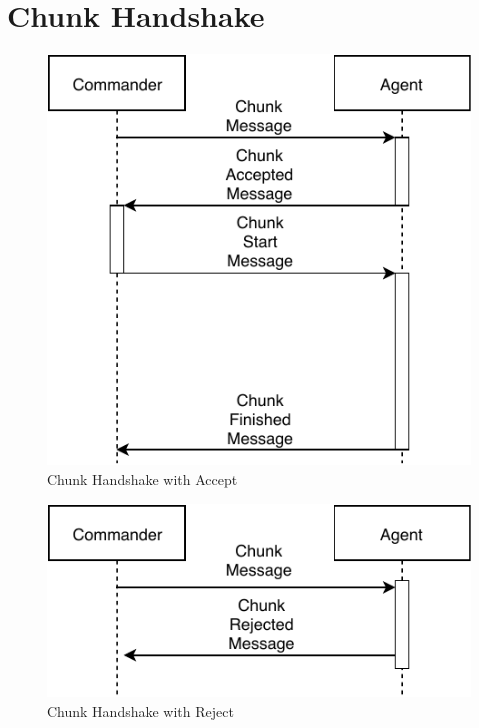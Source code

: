 \section{Chunk Handshake}
\begin{figure}[h]
	\begin{center}
	\includegraphics[scale=1]{Resources/PDF/ChunkAcceptedHandshake}
	\caption{Chunk Handshake with Accept}
	\label{pic:ChunkAcceptedHandshake}
	\end{center}
\end{figure}

\begin{figure}[h]
	\begin{center}
	\includegraphics[scale=1]{Resources/PDF/ChunkRejectHandshake}
	\caption{Chunk Handshake with Reject}
	\label{pic:ChunkRejectHandshake}
	\end{center}
\end{figure}